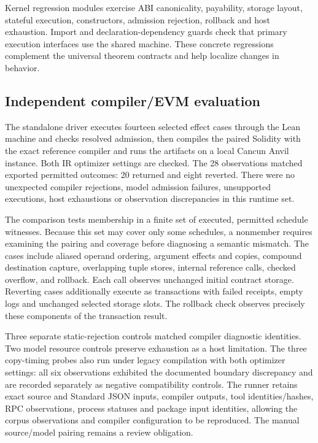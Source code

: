 \documentclass[conference]{IEEEtran}
\begin{document}
Kernel regression modules exercise ABI canonicality, payability, storage
layout, stateful execution, constructors, admission rejection, rollback and
host exhaustion. Import and declaration-dependency guards check that primary
execution interfaces use the shared machine. These concrete regressions
complement the universal theorem contracts and help localize changes in behavior.

\subsection{Independent compiler/EVM evaluation}
The standalone driver executes fourteen selected effect cases through the
Lean machine and checks resolved admission, then compiles the paired Solidity
with the exact reference compiler and runs the artifacts on a local Cancun
Anvil instance. Both IR optimizer settings are checked. The 28 observations
matched exported permitted outcomes: 20 returned and eight reverted. There
were no unexpected compiler rejections, model admission failures, unsupported
executions, host exhaustions or observation discrepancies in this runtime set.

The comparison tests membership in a finite set of executed, permitted schedule
witnesses. Because this set may cover only some schedules, a nonmember requires
examining the pairing and coverage before diagnosing a semantic mismatch.
The cases include aliased
operand ordering, argument effects and copies, compound destination capture,
overlapping tuple stores, internal reference calls, checked overflow, and
rollback. Each call observes unchanged initial contract storage. Reverting
cases additionally execute as transactions with failed receipts, empty logs
and unchanged selected storage slots. The rollback check observes precisely
these components of the transaction result.

Three separate static-rejection controls matched compiler diagnostic identities.
Two model resource controls preserve exhaustion as a host limitation. The three
copy-timing probes also run under legacy compilation with both optimizer
settings: all six observations exhibited the documented boundary discrepancy
and are recorded separately as negative compatibility controls.
The runner retains exact source and Standard JSON inputs, compiler outputs,
tool identities/hashes, RPC observations, process statuses and package input
identities, allowing the corpus observations and compiler configuration to be
reproduced. The manual source/model pairing remains a review obligation.
\end{document}
